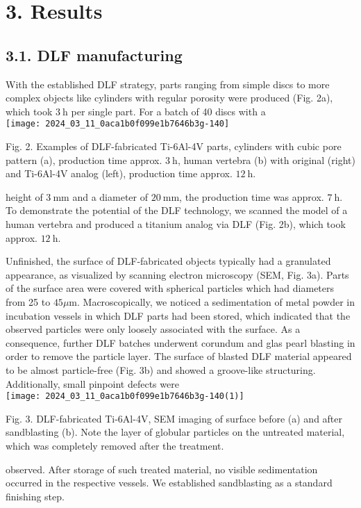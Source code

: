 \documentclass[10pt]{article}
\begin{document}
\section*{3. Results}
\subsection*{3.1. DLF manufacturing}
With the established DLF strategy, parts ranging from simple discs to more complex objects like cylinders with regular porosity were produced (Fig. 2a), which took $3 \mathrm{~h}$ per single part. For a batch of 40 discs with a\\
\texttt{[image: 2024\_03\_11\_0aca1b0f099e1b7646b3g-140]}

Fig. 2. Examples of DLF-fabricated Ti-6Al-4V parts, cylinders with cubic pore pattern (a), production time approx. $3 \mathrm{~h}$, human vertebra (b) with original (right) and Ti-6Al-4V analog (left), production time approx. $12 \mathrm{~h}$.

height of $3 \mathrm{~mm}$ and a diameter of $20 \mathrm{~mm}$, the production time was approx. $7 \mathrm{~h}$. To demonstrate the potential of the DLF technology, we scanned the model of a human vertebra and produced a titanium analog via DLF (Fig. 2b), which took approx. $12 \mathrm{~h}$.

Unfinished, the surface of DLF-fabricated objects typically had a granulated appearance, as visualized by scanning electron microscopy (SEM, Fig. 3a). Parts of the surface area were covered with spherical particles which had diameters from 25 to $45 \mu \mathrm{m}$. Macroscopically, we noticed a sedimentation of metal powder in incubation vessels in which DLF parts had been stored, which indicated that the observed particles were only loosely associated with the surface. As a consequence, further DLF batches underwent corundum and glas pearl blasting in order to remove the particle layer. The surface of blasted DLF material appeared to be almost particle-free (Fig. 3b) and showed a groove-like structuring. Additionally, small pinpoint defects were\\
\texttt{[image: 2024\_03\_11\_0aca1b0f099e1b7646b3g-140(1)]}

Fig. 3. DLF-fabricated Ti-6Al-4V, SEM imaging of surface before (a) and after sandblasting (b). Note the layer of globular particles on the untreated material, which was completely removed after the treatment.

observed. After storage of such treated material, no visible sedimentation occurred in the respective vessels. We established sandblasting as a standard finishing step.
\end{document}
